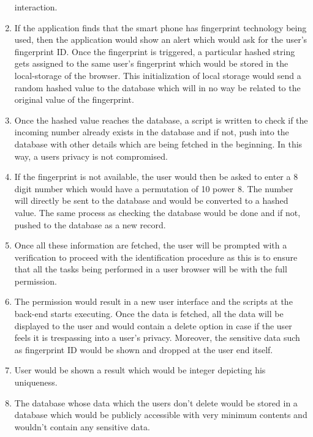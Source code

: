 \documentclass[journal]{IEEEtran}
\begin{document}
\begin{enumerate}
  interaction.
  \item If the application finds that the smart phone has fingerprint technology being used, then the application would show an alert which would ask for the user's fingerprint ID. Once the fingerprint is triggered, a particular hashed string gets assigned to the same user's fingerprint which would be stored in the local-storage of the browser. This initialization of local storage would send a random hashed value to the database which will in no way be related to the original value of the fingerprint. 
  \item Once the hashed value reaches the database, a script is written to check if the incoming number already exists in the database and if not, push into the database with other details which are being fetched in the beginning. In this way, a users privacy is not compromised.
  \item If the fingerprint is not available, the user would then be asked to enter a 8 digit number which would have a permutation of 10 power 8. The number will directly be sent to the database and would be converted to a hashed value. The same process as checking the database would be done and if not, pushed to the database as a new record.
  \item Once all these information are fetched, the user will be prompted with a
  verification to proceed with the identification procedure as this is to ensure that all the tasks being performed in a user browser will be with the full permission. 
  \item The permission would result in a new user interface and the scripts at the back-end starts
  executing. Once the data is fetched, all the data will be displayed to the user and
  would contain a delete option in case if the user feels it is trespassing into a user's
  privacy. Moreover, the sensitive data such as fingerprint ID would be shown and dropped at the user end itself.
  \item User would be shown a result which would be integer depicting his uniqueness. 
  \item The database whose data which the users don't delete would be stored in a database which would
  be publicly accessible with very minimum contents and wouldn't contain any sensitive data.
\end{enumerate}
\end{document}
